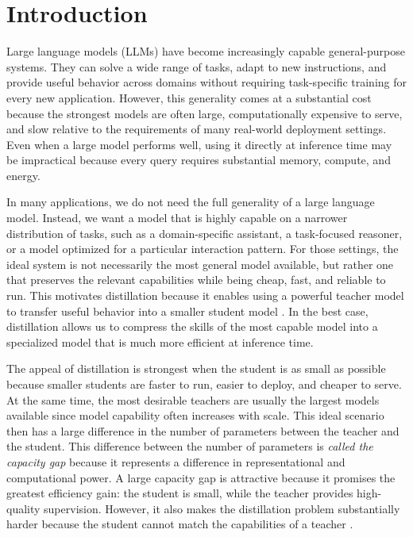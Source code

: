 \chapter{Introduction}

Large language models (LLMs) have become increasingly capable general-purpose systems. They can solve a wide range of tasks, adapt to new instructions, and provide useful behavior across domains without requiring task-specific training for every new application. However, this generality comes at a substantial cost because the strongest models are often large, computationally expensive to serve, and slow relative to the requirements of many real-world deployment settings. Even when a large model performs well, using it directly at inference time may be impractical because every query requires substantial memory, compute, and energy.

In many applications, we do not need the full generality of a large language model. Instead, we want a model that is highly capable on a narrower distribution of tasks, such as a domain-specific assistant, a task-focused reasoner, or a model optimized for a particular interaction pattern. For those settings, the ideal system is not necessarily the most general model available, but rather one that preserves the relevant capabilities while being cheap, fast, and reliable to run. This motivates distillation because it enables using a powerful teacher model to transfer useful behavior into a smaller student model \citep{hintonDistillingKnowledgeNeural2015}. In the best case, distillation allows us to compress the skills of the most capable model into a specialized model that is much more efficient at inference time.

The appeal of distillation is strongest when the student is as small as possible because smaller students are faster to run, easier to deploy, and cheaper to serve. At the same time, the most desirable teachers are usually the largest models available since model capability often increases with scale. This ideal scenario then has a large difference in the number of parameters between the teacher and the student. This difference between the number of parameters is \textit{called the capacity gap} because it represents a difference in representational and computational power. A large capacity gap is attractive because it promises the greatest efficiency gain: the student is small, while the teacher provides high-quality supervision. However, it also makes the distillation problem substantially harder because the student cannot match the capabilities of a teacher \citep{mirzadehImprovedKnowledgeDistillation2019, zhangLiftingCurseCapacity2023}.

